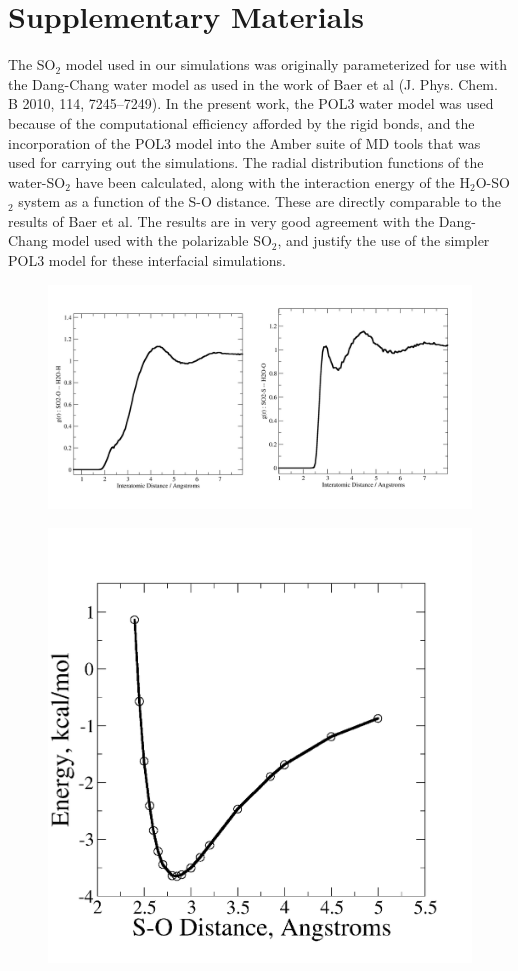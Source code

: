 \section {Supplementary Materials}

The SO$_2$ model used in our simulations was originally parameterized for use with the Dang-Chang water model as used in the work of Baer et al (J. Phys. Chem. B 2010, 114, 7245–7249). In the present work, the POL3 water model was used because of the computational efficiency afforded by the rigid bonds, and the incorporation of the POL3 model into the Amber suite of MD tools that was used for carrying out the simulations. The radial distribution functions of the water-SO$_2$ have been calculated, along with the interaction energy of the H$_2$O-SO$_2$ system as a function of the S-O distance. These are directly comparable to the results of Baer et al. The results are in very good agreement with the Dang-Chang model used with the polarizable SO$_2$, and justify the use of the simpler POL3 model for these interfacial simulations.


\begin{figure}[h!]
	\begin{center}
		\includegraphics[scale=1.0]{images/rdf/rdf.png}
	\end{center}
\end{figure}

\begin{figure}[h!]
	\begin{center}
		\includegraphics[scale=1.0]{images/energy/interaction-energy.png}
	\end{center}
\end{figure}
